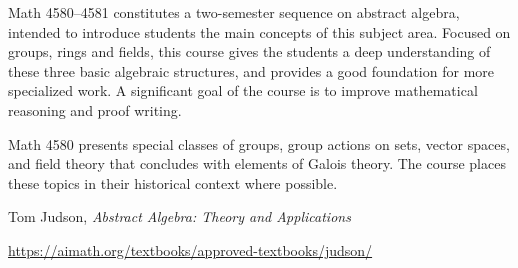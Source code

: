 \documentclass{osucourse}
\begin{document}
\CatalogDescription
\PrerequisitesAndExclusions

\begin{Purpose}
Math 4580--4581 constitutes a two-semester sequence on abstract algebra,
intended to introduce students the main concepts of this subject area.
Focused on groups, rings and fields, this course gives the students a
deep understanding of these three basic algebraic structures, and
provides a good foundation for more specialized work. A significant goal
of the course is to improve mathematical reasoning and proof writing.

Math 4580 presents special classes of groups, group actions on sets,
vector spaces, and field theory that concludes with elements of Galois
theory. The course places these topics in their historical context where
possible.
\end{Purpose}

\begin{Text}
Tom Judson, \emph{Abstract Algebra: Theory and Applications}

\url{https://aimath.org/textbooks/approved-textbooks/judson/}
\end{Text}
\end{document}
